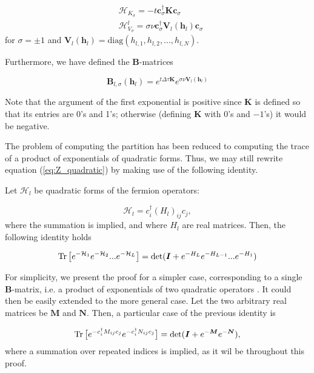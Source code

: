 \begin{equation}
\begin{split}
&\mathcal{H}_{K_\sigma} = - t \bm c_\sigma^\dagger \bm K \bm c_\sigma \\
&\mathcal{H}_{V_\sigma}^l = \sigma \nu \bm c_\sigma^\dagger \bm V_l (\bm h_l) \bm c_\sigma
\end{split}
\end{equation}
for $\sigma = \pm 1$ and $\bm V_l ( \bm h_l ) = \text{diag} ( h_{l, 1} , h_{l, 2}, ... , h_{l, N} )$.

Furthermore, we have defined the $\bm B$-matrices

\begin{equation}
\bm B_{l, \sigma} ( \bm h_l ) = e^{t \Delta \tau \bm K} e^{\sigma \nu \bm V_l (\bm h_l)}
\end{equation}

Note that the argument of the first exponential is positive since $\bm K$ is defined so that its entries are 0's and 1's; otherwise (defining $\bm K$ with 0's and $-1$'s) it would be negative.

The problem of computing the partition has been reduced to computing the trace of a product of exponentials of quadratic forms. Thus, we may still rewrite equation (\ref{eq:Z_quadratic}) by making use of the following identity.

Let $\mathcal{H}_l$ be quadratic forms of the fermion operators:

\begin{equation}
\mathcal{H}_l = c_i^\dagger (H_l)_{ij} c_j,
\end{equation}
where the summation is implied, and where $H_l$ are real matrices. Then, the following identity holds

\begin{equation}\label{eq:quadraticIdentity}
\operatorname{Tr} \big[ e^{-\mathcal{H}_1 } e^{-\mathcal{H}_2 } ... e^{-\mathcal{H}_L } \big] = \text{det} ( \bm I + e^{-H_L} e^{-H_{L-1}} ... e^{-H_1} )
\end{equation}

For simplicity, we present the proof for a simpler case, corresponding to a single $\bm B$-matrix, i.e. a product of exponentials of two quadratic operators \cite{hirsch_two-dimensional_1985}. It could then be easily extended to the more general case. Let the two arbitrary real matrices be $\bm M$ and $\bm N$. Then, a particular case of the previous identity is

\begin{equation}\label{eq:particularIdentity}
\operatorname{Tr} \big[ e^{-c_i^\dagger M_{ij} c_j} e^{-c_i^\dagger N_{ij} c_j} \big] = \text{det} ( \bm I + e^{-{\bm M}} e^{-{\bm N}} ) ,
\end{equation}
where a summation over repeated indices is implied, as it wil be throughout this proof.

